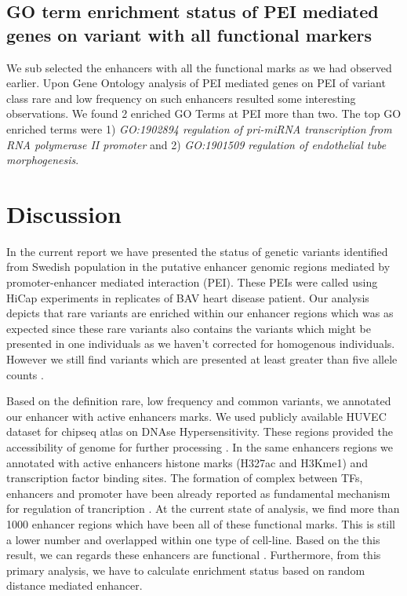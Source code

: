 \documentclass[10pt]{article} %
\begin{document}
\subsection{GO term enrichment status of PEI mediated genes on variant with all functional markers }

We sub selected the enhancers with all the functional marks as we had observed earlier. Upon Gene Ontology analysis of PEI mediated genes on PEI of variant class rare and low frequency on such enhancers resulted some interesting observations. We found 2 enriched GO Terms at PEI more than two. The top GO enriched terms were 1) \textit {GO:1902894 regulation of pri-miRNA
transcription from RNA polymerase II promoter} and 2) \textit {GO:1901509 regulation of endothelial tube morphogenesis}. 

\section{Discussion}

In the current report we have presented the status of genetic variants identified from Swedish population in the putative enhancer genomic regions mediated by promoter-enhancer mediated interaction (PEI). These PEIs were called using HiCap experiments in replicates of BAV heart disease patient.  Our analysis depicts that rare variants are enriched within our enhancer regions which was as expected since these rare variants also contains the variants which might be presented in one individuals as we haven't corrected for homogenous individuals. However we still find variants which are presented at least greater than five allele counts . 

Based on the definition rare, low frequency and common variants, we annotated our enhancer with active enhancers marks. We used publicly available HUVEC dataset for chipseq atlas on DNAse Hypersensitivity. These regions provided the accessibility of genome for  further processing . In the same enhancers regions we annotated with active enhancers histone marks (H327ac and H3Kme1) and transcription factor binding sites. The formation of complex between TFs, enhancers and promoter have been already reported as fundamental mechanism for regulation of trancription \cite{mora2015loop}.  At the current state of analysis, we find more than  1000 enhancer regions which have been all of these functional marks. This is still a lower number and overlapped within one type of cell-line. Based on the this result, we can regards these enhancers are functional . Furthermore, from this primary analysis, we have to calculate enrichment status based on random distance mediated enhancer.
\end{document}
